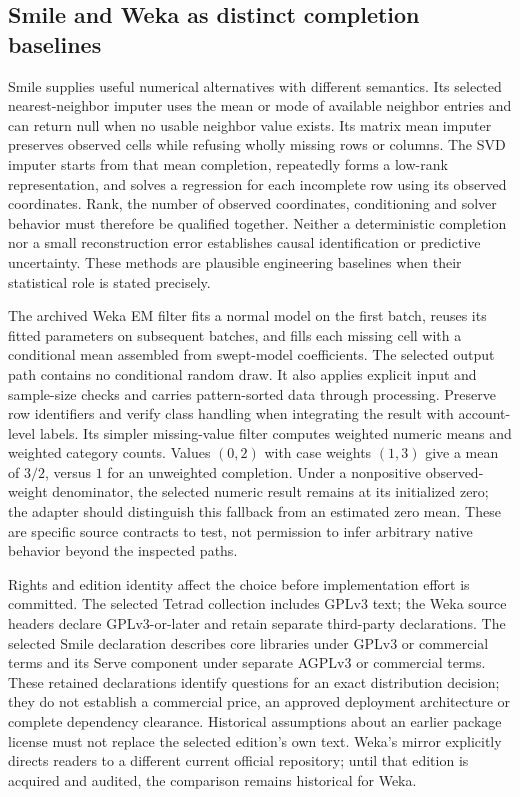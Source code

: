 \subsection*{Smile and Weka as distinct completion baselines}
Smile supplies useful numerical alternatives with different semantics. Its selected nearest-neighbor imputer uses the mean or mode of available neighbor entries and can return null when no usable neighbor value exists. Its matrix mean imputer preserves observed cells while refusing wholly missing rows or columns. The SVD imputer starts from that mean completion, repeatedly forms a low-rank representation, and solves a regression for each incomplete row using its observed coordinates. Rank, the number of observed coordinates, conditioning and solver behavior must therefore be qualified together. Neither a deterministic completion nor a small reconstruction error establishes causal identification or predictive uncertainty. These methods are plausible engineering baselines when their statistical role is stated precisely.\citep{exec25_jtm_smile}

The archived Weka EM filter fits a normal model on the first batch, reuses its fitted parameters on subsequent batches, and fills each missing cell with a conditional mean assembled from swept-model coefficients. The selected output path contains no conditional random draw. It also applies explicit input and sample-size checks and carries pattern-sorted data through processing. Preserve row identifiers and verify class handling when integrating the result with account-level labels. Its simpler missing-value filter computes weighted numeric means and weighted category counts. Values $(0,2)$ with case weights $(1,3)$ give a mean of $3/2$, versus $1$ for an unweighted completion. Under a nonpositive observed-weight denominator, the selected numeric result remains at its initialized zero; the adapter should distinguish this fallback from an estimated zero mean. These are specific source contracts to test, not permission to infer arbitrary native behavior beyond the inspected paths.\citep{exec25_jtm_weka,exec25_jtm_choice}

Rights and edition identity affect the choice before implementation effort is committed. The selected Tetrad collection includes GPLv3 text; the Weka source headers declare GPLv3-or-later and retain separate third-party declarations. The selected Smile declaration describes core libraries under GPLv3 or commercial terms and its Serve component under separate AGPLv3 or commercial terms. These retained declarations identify questions for an exact distribution decision; they do not establish a commercial price, an approved deployment architecture or complete dependency clearance. Historical assumptions about an earlier package license must not replace the selected edition's own text. Weka's mirror explicitly directs readers to a different current official repository; until that edition is acquired and audited, the comparison remains historical for Weka.\citep{exec25_jtm_tetrad,exec25_jtm_smile,exec25_jtm_weka}

